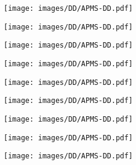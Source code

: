 \begin{figure}
	\begin{center}
    		\texttt{[image: images/DD/APMS-DD.pdf]}
	\end{center}
\end{figure}
\begin{figure}
	\begin{center}
    		\texttt{[image: images/DD/APMS-DD.pdf]}
	\end{center}
\end{figure}
\begin{figure}
	\begin{center}
    		\texttt{[image: images/DD/APMS-DD.pdf]}
	\end{center}
\end{figure}
\begin{figure}
	\begin{center}
    		\texttt{[image: images/DD/APMS-DD.pdf]}
	\end{center}
\end{figure}
\begin{figure}
	\begin{center}
    		\texttt{[image: images/DD/APMS-DD.pdf]}
	\end{center}
\end{figure}
\begin{figure}
	\begin{center}
    		\texttt{[image: images/DD/APMS-DD.pdf]}
	\end{center}
\end{figure}
\begin{figure}
	\begin{center}
    		\texttt{[image: images/DD/APMS-DD.pdf]}
	\end{center}
\end{figure}
\begin{figure}
	\begin{center}
    		\texttt{[image: images/DD/APMS-DD.pdf]}
	\end{center}
\end{figure}
\begin{figure}
	\begin{center}
    		\texttt{[image: images/DD/APMS-DD.pdf]}
	\end{center}
\end{figure}
